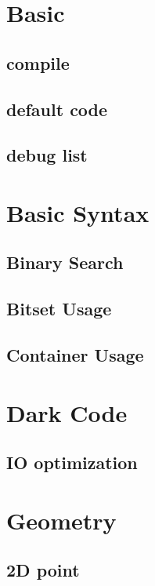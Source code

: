 \section{Basic}

\subsection{compile}

\subsection{default code}

\subsection{debug list}


\section{Basic Syntax}
\subsection{Binary Search}

\subsection{Bitset Usage}

\subsection{Container Usage}



\section{Dark Code}

\subsection{IO optimization}


\section{Geometry}

\subsection{2D point}


